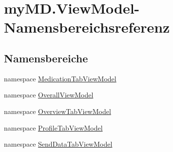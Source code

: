 \hypertarget{namespacemy_m_d_1_1_view_model}{}\section{my\+M\+D.\+View\+Model-\/\+Namensbereichsreferenz}
\label{namespacemy_m_d_1_1_view_model}
\subsection*{Namensbereiche}
\begin{DoxyCompactItemize}
\item 
namespace \mbox{\hyperlink{namespacemy_m_d_1_1_view_model_1_1_medication_tab_view_model}{Medication\+Tab\+View\+Model}}
\item 
namespace \mbox{\hyperlink{namespacemy_m_d_1_1_view_model_1_1_overall_view_model}{Overall\+View\+Model}}
\item 
namespace \mbox{\hyperlink{namespacemy_m_d_1_1_view_model_1_1_overview_tab_view_model}{Overview\+Tab\+View\+Model}}
\item 
namespace \mbox{\hyperlink{namespacemy_m_d_1_1_view_model_1_1_profile_tab_view_model}{Profile\+Tab\+View\+Model}}
\item 
namespace \mbox{\hyperlink{namespacemy_m_d_1_1_view_model_1_1_send_data_tab_view_model}{Send\+Data\+Tab\+View\+Model}}
\end{DoxyCompactItemize}
